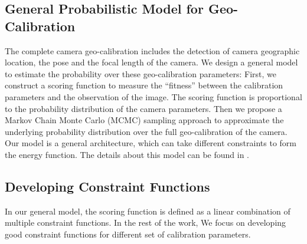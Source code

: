 \subsection{General Probabilistic Model for Geo-Calibration}
The complete camera geo-calibration includes the detection of camera
geographic location, the pose and the focal length of the camera.  We
design a general model to estimate the probability over these
geo-calibration parameters: First, we construct a scoring function to
measure the ``fitness'' between the calibration parameters and the
observation of the image. The scoring function is proportional to the
probability distribution of the camera parameters. Then we propose a
Markov Chain Monte Carlo (MCMC) sampling approach to approximate the
underlying probability distribution over the full geo-calibration of
the camera. 
Our model is a general architecture, which can take
different constraints to form the energy function. The details about
this model can be found in .

\subsection{Developing Constraint Functions}
In our general model, the scoring function is defined as a linear
combination of multiple constraint functions.
In the rest of the work, We focus on developing good constraint
functions for different set of calibration parameters.

